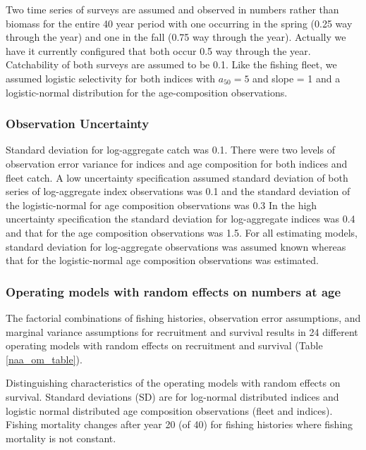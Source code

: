 \documentclass[
  12pt,
]{article}
\begin{document}
Two time series of surveys are assumed and observed in numbers rather
than biomass for the entire 40 year period with one occurring in the
spring (0.25 way through the year) and one in the fall (0.75 way through
the year). Actually we have it currently configured that both occur 0.5
way through the year. Catchability of both surveys are assumed to be
0.1. Like the fishing fleet, we assumed logistic selectivity for both
indices with \(a_{50} = 5\) and slope = 1 and a logistic-normal
distribution for the age-composition observations.

\hypertarget{observation-uncertainty}{%
\subsubsection*{Observation Uncertainty}\label{observation-uncertainty}}

Standard deviation for log-aggregate catch was 0.1. There were two
levels of observation error variance for indices and age composition for
both indices and fleet catch. A low uncertainty specification assumed
standard deviation of both series of log-aggregate index observations
was 0.1 and the standard deviation of the logistic-normal for age
composition observations was 0.3 In the high uncertainty specification
the standard deviation for log-aggregate indices was 0.4 and that for
the age composition observations was 1.5. For all estimating models,
standard deviation for log-aggregate observations was assumed known
whereas that for the logistic-normal age composition observations was
estimated.

\hypertarget{operating-models-with-random-effects-on-numbers-at-age}{%
\subsubsection*{Operating models with random effects on numbers at
age}\label{operating-models-with-random-effects-on-numbers-at-age}}

The factorial combinations of fishing histories, observation error
assumptions, and marginal variance assumptions for recruitment and
survival results in 24 different operating models with random effects on
recruitment and survival (Table \ref{naa_om_table}).

\begin{landscape}
\begin{table}
\caption{Distinguishing characteristics of the operating models with random effects on survival. Standard deviations (SD) are for log-normal distributed indices and logistic normal distributed age composition observations (fleet and indices). Fishing mortality changes after year 20 (of 40) for fishing histories where fishing mortality is not constant.}\label{naa_om_table}
{\footnotesize }
\end{table}
\end{landscape}
\end{document}
